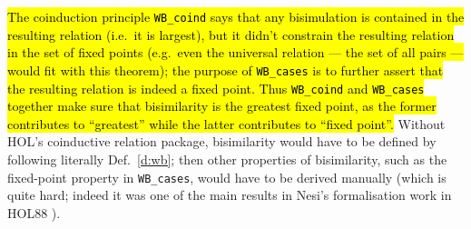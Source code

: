\hl{The coinduction principle \texttt{WB_coind} says that any
bisimulation is contained in the resulting relation (i.e.~it is
largest), but it didn't constrain the resulting relation in the set of
fixed points (e.g.~even the universal relation --- the set of all
pairs --- would fit with this theorem); the
purpose of \texttt{WB_cases} is to
further assert that the resulting relation is indeed a
fixed point. Thus \texttt{WB_coind} and \texttt{WB_cases}
together make sure that bisimilarity is the greatest
fixed point, as
the former contributes to ``greatest'' while the latter
contributes to ``fixed point''.}
%
Without HOL's coinductive relation package, bisimilarity
would have to be defined by following literally
Def.~\ref{d:wb};  then other properties of bisimilarity, such
as the fixed-point property in \texttt{WB_cases}, would have to be
derived manually (which is quite hard; indeed it was one of the main results
in Nesi's formalisation work  in HOL88 \cite{Nesi:1992ve}).

